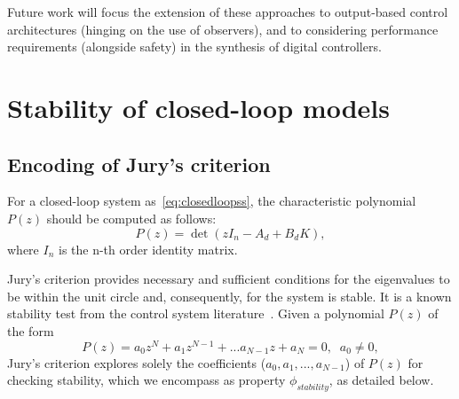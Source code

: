 \documentclass[runningheads,a4paper]{llncs}
\newcommand{\addtodo}[1]{{\color{red} TODO: #1}}
\begin{document}
Future work will focus the extension of these approaches to output-based control architectures (hinging on the use of observers), 
and to considering performance requirements (alongside safety) in the synthesis of digital controllers.  


\newpage


  

\newpage
\appendix
\section{Stability of closed-loop models}
\label{sec:appendix-stability}


\subsection{Encoding of Jury's criterion}

For a closed-loop system as~\eqref{eq:closedloopss}, 
the characteristic polynomial $P(z)$ should be computed as follows:
\begin{equation}
P(z)= \det( z I_{n} - A_d + B_d K ),
\end{equation}
where $I_{n}$ is the n-th order identity matrix. 

Jury's criterion provides necessary and sufficient conditions for the eigenvalues 
to be within the unit circle and, consequently, for the system is stable.  
It is a known stability test from the control system literature~\cite{fadali}.  
Given a 
polynomial $P(z)$ of the form
$$
P(z) = a_{0}z^{N} + a_{1}z^{N-1} + ... a_{N-1}z + a_{N} = 0, \;\; a_{0}\neq 0,
$$
Jury's criterion explores solely the coefficients ($a_{0},a_{1},...,a_{N-1}$) 
of $P(z)$ for checking stability, which we encompass as property $\phi_{stability}$, as detailed below. 
\end{document}
